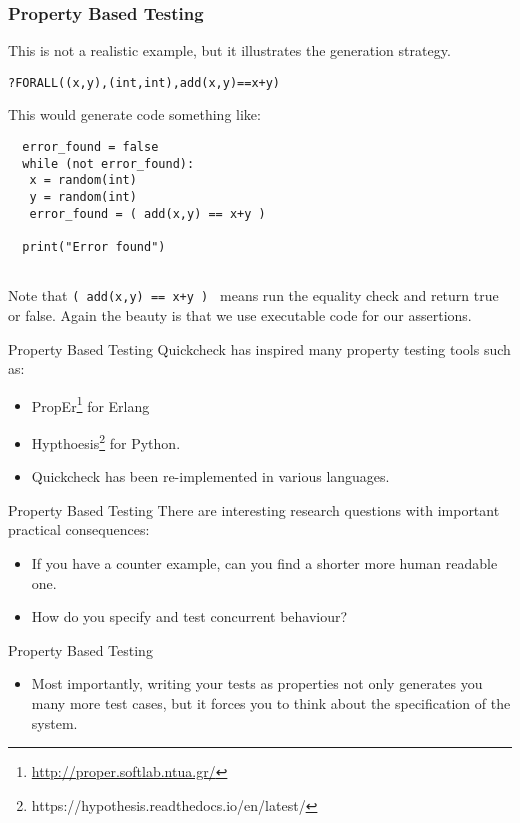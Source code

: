 \documentclass{beamer}
\begin{document}
\begin{frame}[fragile]
  \frametitle{Property Based Testing}
  This is not a realistic example, but it illustrates the generation
  strategy.
\begin{verbatim}
?FORALL((x,y),(int,int),add(x,y)==x+y)
\end{verbatim}
  This would generate code something like:
\begin{lstlisting}
  error_found = false
  while (not error_found):
   x = random(int)
   y = random(int)
   error_found = ( add(x,y) == x+y )

  print("Error found")
  
\end{lstlisting}
  Note that {\tt ( add(x,y) == x+y ) } means run the equality check
  and return true or false. Again the beauty is that we use executable
  code for our assertions.  
\end{frame}
\begin{frame}{Property Based Testing}
  Quickcheck has inspired many property testing tools such as: 
  \begin{itemize}
  \item PropEr\footnote{\url{http://proper.softlab.ntua.gr/}} for
    Erlang
  \item
    Hypthoesis\footnote{https://hypothesis.readthedocs.io/en/latest/}
    for Python.
  \item Quickcheck has been re-implemented in various languages.
   
  \end{itemize}

  
\end{frame}
\begin{frame}{Property Based Testing}
  There are interesting research questions with important practical
  consequences:
  \begin{itemize}
  \item If you have a counter example, can you find a shorter more
    human readable one.
  \item How do you specify and test concurrent behaviour?  
  \end{itemize}
\end{frame}
\begin{frame}{Property Based Testing}

  \begin{itemize}
  \item Most importantly, writing your tests as properties not only
    generates you many more test cases, but it forces you to think
    about the specification of the system.
  \end{itemize}
\end{frame}


\end{document}
